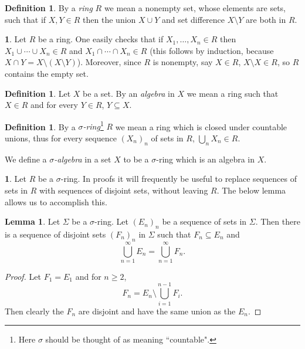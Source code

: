 \documentclass[12pt]{book}
\newcommand{\dfn}[1]{\emph{#1}\index{#1}}
\theoremstyle{definition}
\newtheorem{lemma}[theorem]{Lemma}
\newtheorem{subsec}[theorem]{}
\newtheorem{definition}[theorem]{Definition}
\begin{document}
\begin{definition}
By a \dfn{ring} $R$ we mean a nonempty set, whose elements are sets, such that if $X, Y \in R$ then the union $X \cup Y$ and set difference $X \setminus Y$ are both in $R$.
\end{definition}

\begin{subsec}
Let $R$ be a ring.
One easily checks that if $X_1, \dots, X_n \in R$ then $X_1 \cup \cdots \cup X_n \in R$ and $X_1 \cap \cdots \cap X_n \in R$ (this follows by induction, because $X \cap Y = X \setminus (X \setminus Y)$).
Moreover, since $R$ is nonempty, say $X \in R$, $X \setminus X \in R$, so $R$ contains the empty set.
\end{subsec}

\begin{definition}
Let $X$ be a set. By an \dfn{algebra} in $X$ we mean a ring such that $X \in R$ and for every $Y \in R$, $Y \subseteq X$.
\end{definition}

\begin{definition}
By a \dfn{$\sigma$-ring}\footnote{Here $\sigma$ should be thought of as meaning ``countable".} $R$ we mean a ring which is closed under countable unions, thus for every sequence $(X_n)_n$ of sets in $R$, $\bigcup_n X_n \in R$.

We define a \dfn{$\sigma$-algebra} in a set $X$ to be a $\sigma$-ring which is an algebra in $X$.
\end{definition}

\begin{subsec}
Let $R$ be a $\sigma$-ring.
In proofs it will frequently be useful to replace sequences of sets in $R$ with sequences of disjoint sets, without leaving $R$.
The below lemma allows us to accomplish this.
\end{subsec}

\begin{lemma}
Let $\Sigma$ be a $\sigma$-ring.
Let $(E_n)_n$ be a sequence of sets in $\Sigma$. Then there is a sequence of disjoint sets $(F_n)_n$ in $\Sigma$ such that $F_n \subseteq E_n$ and
$$\bigcup_{n=1}^\infty E_n = \bigcup_{n=1}^\infty F_n.$$
\end{lemma}
\begin{proof}
Let $F_1 = E_1$ and for $n \geq 2$,
$$F_n = E_n \setminus \bigcup_{i=1}^{n-1} F_i.$$
Then clearly the $F_n$ are disjoint and have the same union as the $E_n$.
\end{proof}
\end{document}
